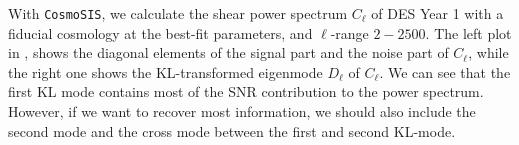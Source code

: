 \documentclass[twocolumn]{\docclass}
\def\bea{\begin{eqnarray}}
\def\eea{\end{eqnarray}}
\def\svs{\nonumber\\}
\begin{document}
	
	With  {\tt CosmoSIS}, we calculate the shear power spectrum $C_{\ell}$ of DES Year 1 with a fiducial cosmology at the best-fit parameters, and $\ell$-range $2-2500$. The left plot in , shows the diagonal elements of the signal part and the noise part of $C_{\ell}$, while the right one shows the KL-transformed eigenmode $D_{\ell}$ of $C_{\ell}$. We can see that the first KL mode contains most of the SNR contribution to the power spectrum. However, if we want to recover most information, we should also include the second mode and the cross mode between the first and second KL-mode.
	
\end{document}
